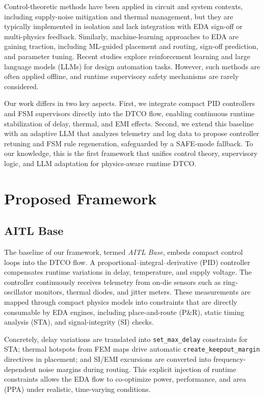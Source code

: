 \documentclass[conference]{IEEEtran}
\begin{document}
Control-theoretic methods have been applied in circuit and system contexts, including supply-noise mitigation and thermal management, but they are typically implemented in isolation and lack integration with EDA sign-off or multi-physics feedback. Similarly, machine-learning approaches to EDA are gaining traction, including ML-guided placement and routing, sign-off prediction, and parameter tuning. Recent studies explore reinforcement learning and large language models (LLMs) for design automation tasks. However, such methods are often applied offline, and runtime supervisory safety mechanisms are rarely considered.

Our work differs in two key aspects. First, we integrate compact PID controllers and FSM supervisors directly into the DTCO flow, enabling continuous runtime stabilization of delay, thermal, and EMI effects. Second, we extend this baseline with an adaptive LLM that analyzes telemetry and log data to propose controller retuning and FSM rule regeneration, safeguarded by a SAFE-mode fallback. To our knowledge, this is the first framework that unifies control theory, supervisory logic, and LLM adaptation for physics-aware runtime DTCO.

\section{Proposed Framework}

\subsection{AITL Base}
The baseline of our framework, termed \emph{AITL Base}, embeds compact control loops into the DTCO flow.  
A proportional--integral--derivative (PID) controller compensates runtime variations in delay, temperature, and supply voltage. The controller continuously receives telemetry from on-die sensors such as ring-oscillator monitors, thermal diodes, and jitter meters. These measurements are mapped through compact physics models into constraints that are directly consumable by EDA engines, including place-and-route (P\&R), static timing analysis (STA), and signal-integrity (SI) checks.

Concretely, delay variations are translated into \texttt{set\_max\_delay} constraints for STA; thermal hotspots from FEM maps drive automatic \texttt{create\_keepout\_margin} directives in placement; and SI/EMI excursions are converted into frequency-dependent noise margins during routing. This explicit injection of runtime constraints allows the EDA flow to co-optimize power, performance, and area (PPA) under realistic, time-varying conditions.
\end{document}
